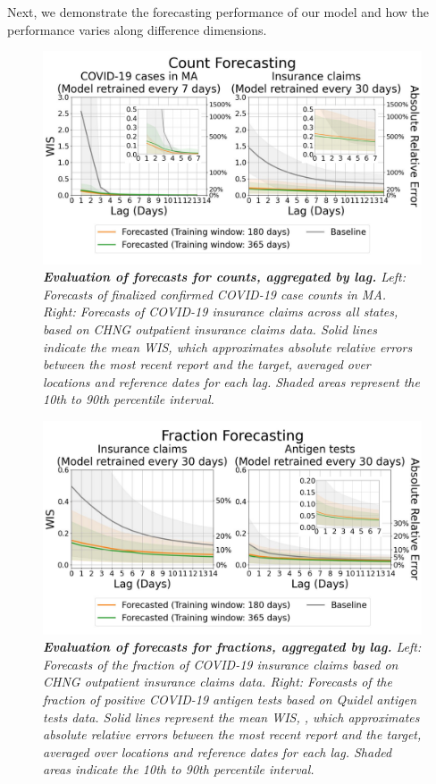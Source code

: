 Next, we demonstrate the forecasting performance of our model and how the performance varies along difference dimensions. 

\begin{figure}[h!]
    \centering
    \includegraphics[width=\textwidth]{figs/experiment_count_result_evl_general.pdf}
    \caption{\emph{\textbf{Evaluation of forecasts for counts, aggregated by lag.} Left: Forecasts of finalized confirmed COVID-19 case counts in MA. Right: Forecasts of COVID-19 insurance claims across all states, based on CHNG outpatient insurance claims data. Solid lines indicate the mean WIS, which approximates absolute relative errors between the most recent report and the target, averaged over locations and reference dates for each lag. Shaded areas represent the 10th to 90th percentile interval.}}
\end{figure}

\begin{figure}[h!]
    \centering
    \includegraphics[width=\textwidth]{figs/experiment_fraction_result_evl_general.pdf}
    \caption{\emph{\textbf{Evaluation of forecasts for fractions, aggregated by lag.} Left: Forecasts of the fraction of COVID-19 insurance claims based on CHNG outpatient insurance claims data. Right: Forecasts of the fraction of positive COVID-19 antigen tests based on Quidel antigen tests data. Solid lines represent the mean WIS, , which approximates absolute relative errors between the most recent report and the target, averaged over locations and reference dates for each lag. Shaded areas indicate the 10th to 90th percentile interval.}}
\end{figure}


